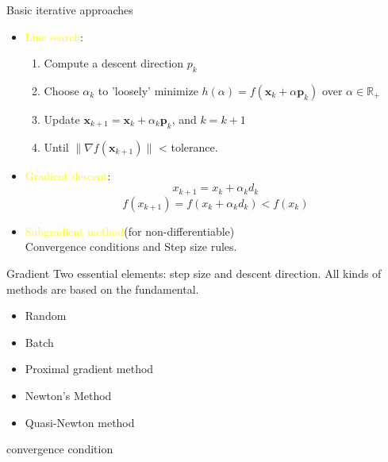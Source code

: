     \begin{frame}{Basic iterative approaches}
      \begin{itemize}
        \item \textcolor{yellow}{Line search}:
        \begin{enumerate}
          \item Compute a descent direction $p_k$
          \item Choose $ \displaystyle \alpha _{k} $ to 'loosely' minimize $ h(\alpha )=f(\mathbf {x} _{k}+\alpha \mathbf {p} _{k}) $ over $ \alpha \in \mathbb {R} _{+}$
          \item Update $ \mathbf {x} _{k+1}=\mathbf {x} _{k}+\alpha _{k}\mathbf {p} _{k} $, and $ {\textstyle k=k+1} $
          \item Until $ \|\nabla f(\mathbf {x} _{k+1})\| $ < tolerance.
        \end{enumerate}

        \item \textcolor{yellow}{Gradient descent}:
        \[x_{k+1}=x_k+\alpha_k d_k\]
        \[f(x_{k+1}) = f(x_k+\alpha_k d_k) < f(x_k)\]
        \item \textcolor{yellow}{Subgradient method}(for non-differentiable)
        \\
        Convergence conditions and Step size rules.
      \end{itemize}
    \end{frame}

    \begin{frame}{Gradient}
      Two essential elements: step size and descent direction. All kinds of methods are based on the fundamental.
      \begin{itemize}
        \item Random
        \item Batch
        \item Proximal gradient method
        \item Newton's Method
        \item Quasi-Newton method
      \end{itemize}
      convergence condition
    \end{frame}


